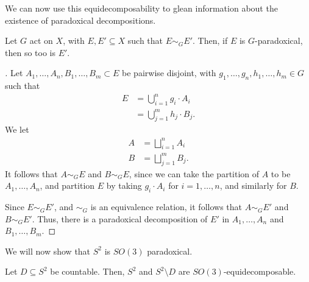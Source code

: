 We can now use this equidecomposability to glean information about the existence of paradoxical decompositions.
\begin{proposition}
  Let $G$ act on $X$, with $E,E'\subseteq X$ such that $E\sim_{G}E'$. Then, if $E$ is $G$-paradoxical, then so too is $E'$.
\end{proposition}

\begin{proof}[]
Let $A_1,\dots,A_n,B_1,\dots,B_m\subset E$ be pairwise disjoint, with $g_1,\dots,g_n,h_1,\dots,h_m\in G$ such that
\begin{align*}
  E &= \bigcup_{i=1}^{n}g_i\cdot A_i\\
    &= \bigcup_{j=1}^{m}h_j\cdot B_j.
\end{align*}
We let
\begin{align*}
  A &= \bigsqcup_{i=1}^{n}A_i\\
  B &= \bigsqcup_{j=1}^{m}B_j.
\end{align*}
It follows that $A\sim_{G}E$ and $B\sim_{G}E$, since we can take the partition of $A$ to be $A_1,\dots,A_n$, and partition $E$ by taking $g_i\cdot A_i$ for $i=1,\dots,n$, and similarly for $B$.\newline

Since $E\sim_{G}E'$, and $\sim_{G}$ is an equivalence relation, it follows that $A\sim_{G}E'$ and $B\sim_{G}E'$. Thus, there is a paradoxical decomposition of $E'$ in $A_1,\dots,A_n$ and $B_1,\dots,B_m$.
\end{proof}
We will now show that $S^{2}$ is $SO(3)$ paradoxical.
\begin{proposition}
  Let $D\subseteq S^{2}$ be countable. Then, $S^{2}$ and $S^{2}\setminus D$ are $SO(3)$-equidecomposable.
\end{proposition}

